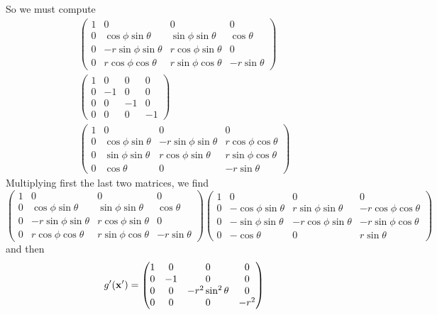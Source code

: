 \documentclass[oneside, 10pt, notitlepage]{book}
\begin{document}
So we must compute
\begin{multline}
\begin{pmatrix}
1 & 0 & 0 & 0 \\
0 & \cos \phi \sin \theta & \sin \phi \sin \theta & \cos \theta\\
0 & -r\sin \phi \sin \theta & r \cos \phi \sin \theta & 0 \\
0 & r \cos \phi \cos \theta & r \sin \phi \cos \theta & -r\sin \theta
\end{pmatrix}\\
\begin{pmatrix}
1 & 0 & 0 & 0 \\
0 & -1 & 0 & 0 \\
0 & 0 & -1 & 0 \\
0 & 0 & 0 & -1
\end{pmatrix}\\
\begin{pmatrix}
1 & 0 & 0 & 0 \\
0 & \cos \phi \sin \theta & -r\sin \phi \sin \theta & r \cos \phi \cos \theta\\
0 & \sin \phi \sin \theta & r \cos \phi \sin \theta & r \sin \phi \cos \theta\\
0 & \cos \theta & 0 & -r\sin \theta
\end{pmatrix}
\end{multline}
Multiplying first the last two matrices, we find
\begin{equation}
\begin{pmatrix}
1 & 0 & 0 & 0 \\
0 & \cos \phi \sin \theta & \sin \phi \sin \theta & \cos \theta\\
0 & -r\sin \phi \sin \theta & r \cos \phi \sin \theta & 0 \\
0 & r \cos \phi \cos \theta & r \sin \phi \cos \theta & -r\sin \theta
\end{pmatrix} 
\begin{pmatrix}
1 & 0 & 0 & 0 \\
0 & -\cos \phi \sin \theta & r\sin \phi \sin \theta & -r \cos \phi \cos \theta\\
0 & -\sin \phi \sin \theta & -r \cos \phi \sin \theta & -r \sin \phi \cos \theta\\
0 & -\cos \theta & 0 & r\sin \theta
\end{pmatrix}
\end{equation}
and then
\begin{equation}
g'(\vb{x'})=
\begin{pmatrix}
1 & 0 & 0 & 0 \\
0 & -1 & 0 & 0 \\
0 & 0 & -r^2 \sin ^2 \theta & 0 \\
0 & 0 & 0 & -r^2 
\end{pmatrix}
\end{equation}


\end{document}
